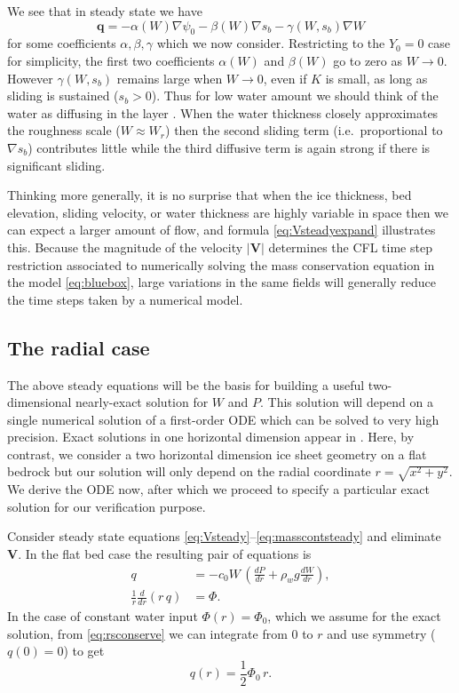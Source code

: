 \documentclass[11pt,final]{amsart}%
\newcommand\bV{\mathbf{V}}
\newcommand\bq{\mathbf{q}}
\newcommand{\grad}{\nabla}
\begin{document}
We see that in steady state we have
\begin{equation}
\bq = - \alpha(W) \grad \psi_0 - \beta(W) \grad s_b - \gamma(W,s_b) \grad W  \label{eq:qabstract}
\end{equation}
for some coefficients $\alpha,\beta,\gamma$ which we now consider.  Restricting to the $Y_0=0$ case for simplicity, the first two coefficients $\alpha(W)$ and $\beta(W)$ go to zero as $W\to 0$.  However $\gamma(W,s_b)$ remains large when $W\to 0$, even if $K$ is small, as long as sliding is sustained ($s_b > 0$).  Thus for low water amount we should think of the water as diffusing in the layer \citep[compare equation (11) in][]{BBssasliding}.  When the water thickness closely approximates the roughness scale ($W\approx W_r$) then the second sliding term (i.e.~proportional to $\grad s_b$) contributes little while the third diffusive term is again strong if there is significant sliding.

Thinking more generally, it is no surprise that when the ice thickness, bed elevation, sliding velocity, or water thickness are highly variable in space then we can expect a larger amount of flow, and formula \eqref{eq:Vsteadyexpand} illustrates this.  Because the magnitude of the velocity $|\bV|$ determines the CFL time step restriction \citep{MortonMayers} associated to numerically solving the mass conservation equation in the model \eqref{eq:bluebox}, large variations in the same fields will generally reduce the time steps taken by a numerical model.


\subsection*{The radial case}  The above steady equations will be the basis for building a useful two-dimensional nearly-exact solution for $W$ and $P$.  This solution will depend on a single numerical solution of a first-order ODE which can be solved to very high precision.  Exact solutions in one horizontal dimension appear in \cite{Schoofetal2012}.  Here, by contrast, we consider a two horizontal dimension ice sheet geometry on a flat bedrock but our solution will only depend on the radial coordinate $r = \sqrt{x^2+y^2}$.  We derive the ODE now, after which we proceed to specify a particular exact solution for our verification purpose.

Consider steady state equations \eqref{eq:Vsteady}--\eqref{eq:masscontsteady} and eliminate $\bV$.  In the flat bed case the resulting pair of equations is
\begin{align}
q &= - c_0 W\, \left(\frac{dP}{dr} + \rho_w g \frac{dW}{dr}\right), \label{eq:rsflux} \\
\frac{1}{r}\frac{d}{dr}\left(r\,q\right) &= \Phi. \label{eq:rsconserve}
\end{align}
In the case of constant water input $\Phi(r)=\Phi_0$, which we assume for the exact solution, from \eqref{eq:rsconserve} we can integrate from $0$ to $r$ and use symmetry ($q(0)=0$) to get
\begin{equation}
q(r) = \frac{1}{2} \Phi_0\, r. \label{eq:qradial}
\end{equation}
\end{document}
